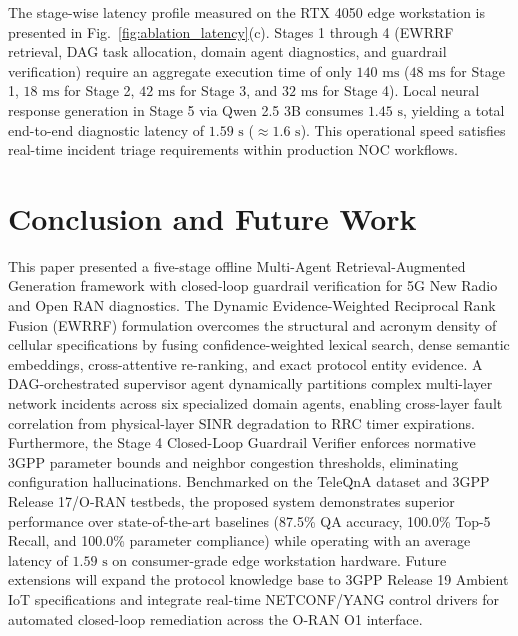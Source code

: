 \documentclass[conference]{IEEEtran}
\begin{document}
The stage-wise latency profile measured on the RTX 4050 edge workstation is presented in Fig.~\ref{fig:ablation_latency}(c). Stages 1 through 4 (EWRRF retrieval, DAG task allocation, domain agent diagnostics, and guardrail verification) require an aggregate execution time of only $140\text{ ms}$ ($48\text{ ms}$ for Stage 1, $18\text{ ms}$ for Stage 2, $42\text{ ms}$ for Stage 3, and $32\text{ ms}$ for Stage 4). Local neural response generation in Stage 5 via Qwen 2.5 3B consumes $1.45\text{ s}$, yielding a total end-to-end diagnostic latency of $1.59\text{ s}$ ($\approx 1.6\text{ s}$). This operational speed satisfies real-time incident triage requirements within production NOC workflows.

\section{Conclusion and Future Work}
This paper presented a five-stage offline Multi-Agent Retrieval-Augmented Generation framework with closed-loop guardrail verification for 5G New Radio and Open RAN diagnostics. The Dynamic Evidence-Weighted Reciprocal Rank Fusion (EWRRF) formulation overcomes the structural and acronym density of cellular specifications by fusing confidence-weighted lexical search, dense semantic embeddings, cross-attentive re-ranking, and exact protocol entity evidence. A DAG-orchestrated supervisor agent dynamically partitions complex multi-layer network incidents across six specialized domain agents, enabling cross-layer fault correlation from physical-layer SINR degradation to RRC timer expirations. Furthermore, the Stage 4 Closed-Loop Guardrail Verifier enforces normative 3GPP parameter bounds and neighbor congestion thresholds, eliminating configuration hallucinations. Benchmarked on the TeleQnA dataset and 3GPP Release 17/O-RAN testbeds, the proposed system demonstrates superior performance over state-of-the-art baselines (87.5\% QA accuracy, 100.0\% Top-5 Recall, and 100.0\% parameter compliance) while operating with an average latency of $1.59\text{ s}$ on consumer-grade edge workstation hardware. Future extensions will expand the protocol knowledge base to 3GPP Release 19 Ambient IoT specifications and integrate real-time NETCONF/YANG control drivers for automated closed-loop remediation across the O-RAN O1 interface.



\end{document}
